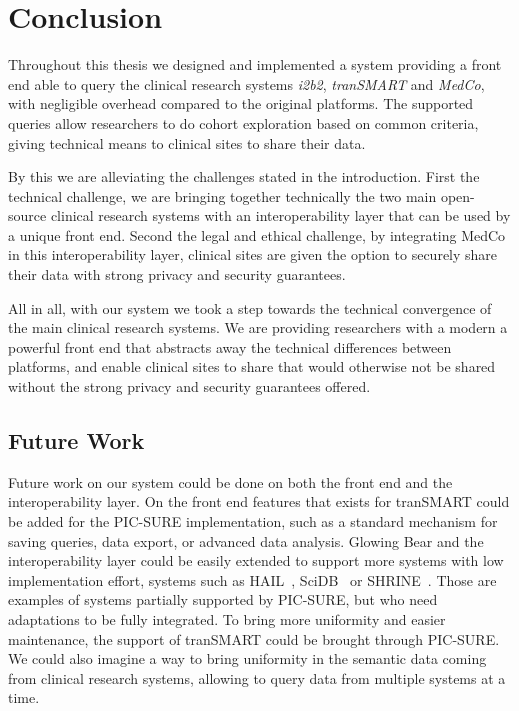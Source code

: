 \chapter{Conclusion}
\label{sec:conclusion}

Throughout this thesis we designed and implemented a system providing a front end able to query the clinical research systems \emph{i2b2}, \emph{tranSMART} and \emph{MedCo}, with negligible overhead compared to the original platforms.
The supported queries allow researchers to do cohort exploration based on common criteria, giving technical means to clinical sites to share their data.

%
By this we are alleviating the challenges stated in the introduction.
First the technical challenge, we are bringing together technically the two main open-source clinical research systems with an interoperability layer that can be used by a unique front end.
Second the legal and ethical challenge, by integrating MedCo in this interoperability layer, clinical sites are given the option to securely share their data with strong privacy and security guarantees.

All in all, with our system we took a step towards the technical convergence of the main clinical research systems.
We are providing researchers with a modern a powerful front end that abstracts away the technical differences between platforms, and enable clinical sites to share that would otherwise not be shared without the strong privacy and security guarantees offered. 



\section{Future Work}
\label{sec:futurework}

Future work on our system could be done on both the front end and the interoperability layer.
On the front end features that exists for tranSMART could be added for the PIC-SURE implementation, such as a standard mechanism for saving queries, data export, or advanced data analysis.
Glowing Bear and the interoperability layer could be easily extended to support more systems with low implementation effort, systems such as HAIL~\cite{hail}, SciDB~\cite{brown2010overview} or SHRINE~\cite{shrine}.
Those are examples of systems partially supported by PIC-SURE, but who need adaptations to be fully integrated.
To bring more uniformity and easier maintenance, the support of tranSMART could be brought through PIC-SURE.
We could also imagine a way to bring uniformity in the semantic data coming from clinical research systems, allowing to query data from multiple systems at a time.

